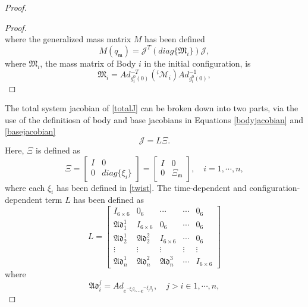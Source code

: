 \documentclass[lettersize,journal]{IEEEtran}
\def \Ad {\textbf{Ad}}
\def \Add {\mathfrak{Ad}}
\begin{document}
\begin{proof}[Proof]
\begin{proof}[Proof]
\begin{equation}
\end{equation}
where the generalized mass matrix $M$ has been defined 
\begin{equation}
    M(q_\mathfrak{m})=\mathcal{J}^T(diag\{\mathfrak{M}_i\})\mathcal{J},%
    \label{totalM}
\end{equation}
where $\mathfrak{M}_i$, the mass matrix of Body $i$ in the initial configuration, is
\begin{equation}
    \mathfrak{M}_i=Ad_{g^0_i(0)}^{-T}({}^i\mathcal{M}_i)Ad_{g^0_i(0)}^{-1},
    \label{initmass}
\end{equation}
\end{proof}

The total system jacobian of \eqref{totalJ} can be broken down into two parts, via the use of the definitiosn of body and base jacobians in Equations \ref{bodyjacobian} and \ref{basejacobian}
\begin{equation}
    \mathcal{J}=L\Xi.
\end{equation}
Here, $\Xi$ is defined as
\begin{equation}
\Xi=\begin{bmatrix}I&0\\0&diag\bigg\{\xi_i\bigg\}\end{bmatrix}=\begin{bmatrix}I&0\\0&\Xi_\mathfrak{m}\end{bmatrix}, \quad i=1,\cdots,n,
\end{equation}
where each $\xi_i$ has been defined in \eqref{twist}. The time-dependent and configuration-dependent term $L$ has been defined as
\begin{equation}
L=\begin{bmatrix}I_{6\times6}& 0_6 & \cdots&\cdots&0_6\\ \Add_1^1&I_{6\times6}&0_6&\cdots&0_6\\ \Add^1_2 & \Add^2_2 &I_{6\times6}&\cdots&0_6\\ \vdots &\vdots & \vdots &\vdots & \vdots\\ \Add^1_n& \Add^2_n &\Add^3_n&\cdots&I_{6\times6} \end{bmatrix}
\label{LofJ}
\end{equation}
where
\begin{equation}
    \Add^j_i=Ad_{e^{-\xi_{i}q_{i}}\cdots e^{-\xi_jq_j}}, \quad j>i \in 1, \cdots , n,
\end{equation}

\end{proof}
\end{document}
